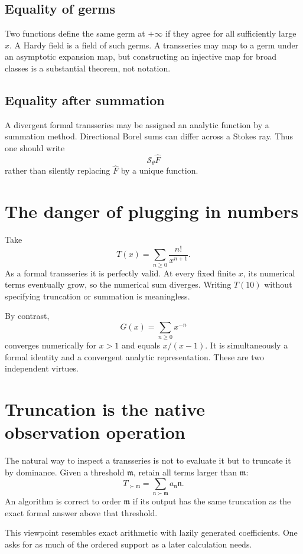 \documentclass[11pt,openany]{book}
\theoremstyle{definition}
\theoremstyle{plain}
\theoremstyle{remark}
\newcommand{\m}{\mathfrak{m}}
\newcommand{\n}{\mathfrak{n}}
\newcommand{\succdom}{\succ}
\newcommand{\trans}[1]{\widehat{#1}}
\newcommand{\lateralsum}[1]{\mathcal{S}_{#1}}
\begin{document}
\subsection{Equality of germs}

Two functions define the same germ at $+\infty$ if they agree for all sufficiently large $x$. A Hardy field is a field of such germs. A transseries may map to a germ under an asymptotic expansion map, but constructing an injective map for broad classes is a substantial theorem, not notation.

\subsection{Equality after summation}

A divergent formal transseries may be assigned an analytic function by a summation method. Directional Borel sums can differ across a Stokes ray. Thus one should write
\[
 \lateralsum{\theta}\trans F
\]
rather than silently replacing $\trans F$ by a unique function.

\section{The danger of plugging in numbers}

Take
\[
 T(x)=\sum_{n\ge0}\frac{n!}{x^{n+1}}.
\]
As a formal transseries it is perfectly valid. At every fixed finite $x$, its numerical terms eventually grow, so the numerical sum diverges. Writing $T(10)$ without specifying truncation or summation is meaningless.

By contrast,
\[
 G(x)=\sum_{n\ge0}x^{-n}
\]
converges numerically for $x>1$ and equals $x/(x-1)$. It is simultaneously a formal identity and a convergent analytic representation. These are two independent virtues.

\section{Truncation is the native observation operation}

The natural way to inspect a transseries is not to evaluate it but to truncate it by dominance. Given a threshold $\m$, retain all terms larger than $\m$:
\[
 T_{\succdom\m}=\sum_{\n\succdom\m}a_{\n}\n.
\]
An algorithm is correct to order $\m$ if its output has the same truncation as the exact formal answer above that threshold.

This viewpoint resembles exact arithmetic with lazily generated coefficients. One asks for as much of the ordered support as a later calculation needs.
\end{document}
